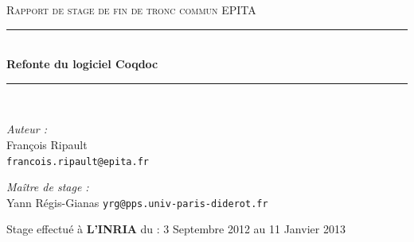 \begin{titlepage}
\begin{center}
\textsc{\Large Rapport de stage de fin de tronc commun EPITA}

\vfill

\rule{\linewidth}{0.5mm} \\[0.4cm]
{\huge \bfseries Refonte du logiciel Coqdoc}
\rule{\linewidth}{0.5mm} \\[1.5cm]

\begin{minipage}{0.4\textwidth}
\begin{flushleft} \large
\emph{Auteur :}\\
François Ripault \\
\small
\texttt{francois.ripault@epita.fr}
\end{flushleft}
\end{minipage}
\begin{minipage}{0.4\textwidth}
\begin{flushright} \large
\emph{Maître de stage :} \\
Yann Régis-Gianas
\small
\texttt{yrg@pps.univ-paris-diderot.fr}
\end{flushright}
\end{minipage}

\vfill


\vfill
Stage effectué à \textbf{L'INRIA} du : 3 Septembre 2012 au 11 Janvier 2013


\end{center}
\end{titlepage}
